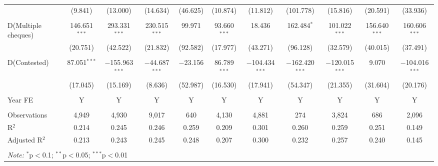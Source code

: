 \begin{landscape}
\begin{table}
{\begin{tabular}{lcccccccccc}
 & (9.841) & (13.000) & (14.634) & (46.625) & (10.874) & (11.812) & (101.778) & (15.816) & (20.591) & (33.936) \\ 
 & & & & & & & & & & \\ 
 D(Multiple cheques) & 146.651$^{***}$ & 293.331$^{***}$ & 230.515$^{***}$ & 99.971 & 93.660$^{***}$ & 18.436 & 162.484$^{*}$ & 101.022$^{***}$ & 156.640$^{***}$ & 160.606$^{***}$ \\ 
 & (20.751) & (42.522) & (21.832) & (92.582) & (17.977) & (43.271) & (96.128) & (32.579) & (40.015) & (37.491) \\ 
 & & & & & & & & & & \\ 
 D(Contested) & 87.051$^{***}$ & $-$155.963$^{***}$ & $-$44.687$^{***}$ & $-$23.156 & 86.789$^{***}$ & $-$104.434$^{***}$ & $-$162.420$^{***}$ & $-$120.015$^{***}$ & 9.070 & $-$104.016$^{***}$ \\ 
 & (17.045) & (15.169) & (8.636) & (52.987) & (16.530) & (17.941) & (54.347) & (21.355) & (31.604) & (20.176) \\
 \hline \\[-1.8ex]
 Year FE & Y & Y & Y & Y & Y & Y & Y & Y & Y & Y \\
 \hline \\[-1.8ex] 
 Observations & 4,949 & 4,930 & 9,017 & 640 & 4,130 & 4,881 & 274 & 3,824 & 686 & 2,096 \\ 
 R$^{2}$ & 0.214 & 0.245 & 0.246 & 0.259 & 0.209 & 0.301 & 0.260 & 0.259 & 0.251 & 0.149 \\ 
 Adjusted R$^{2}$ & 0.213 & 0.243 & 0.245 & 0.248 & 0.207 & 0.300 & 0.232 & 0.257 & 0.240 & 0.145 \\ 
 \hline \\[-1.8ex] 
 \multicolumn{11}{l}{\textit{Note:} $^{*}$p$<$0.1; $^{**}$p$<$0.05; $^{***}$p$<$0.01} \\ 
 \end{tabular}}
 \end{table}
 \end{landscape}

